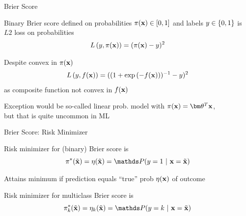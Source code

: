 \documentclass[11pt,compress,t,notes=noshow, xcolor=table]{beamer}
\begin{document}
    


\begin{framei}[fs=small,sep=M]{Brier Score}

\item Binary Brier score defined on probabilities $\pi(\mathbf{x}) \in [0, 1]$ and labels $y \in \{0, 1\}$ is $L2$ loss on probabilities $$L\left(y, \pi(\mathbf{x})\right) = (\pi(\mathbf{x}) - y)^2$$
\item Despite convex in $\pi(\mathbf{x})$ $$L\left(y, f(\mathbf{x})\right)=((1+\exp{(-f(\mathbf{x}))})^{-1}-y)^2$$ as composite function not convex in $f(\mathbf{x})$
\item Exception would be so-called linear prob. model with $\pix = \thetav^T \xv$,\\
but that is quite uncommon in ML 

\vfill 


\end{framei}

\begin{framei}[sep=L]{Brier Score: Risk Minimizer}

\item Risk minimizer for (binary) Brier score is $$\piastxtil = \eta(\xtil) = \P(y=1~|~\xv = \xtil)$$
\item Attains minimum if prediction equals \enquote{true} prob $\eta(\mathbf{x})$ of outcome
\item Risk minimizer for multiclass Brier score is 
$$\piastkxtil = \eta_k(\xtil) =  \P(y = k ~|~ \xv = \xtil) $$

\end{framei}
\end{document}
